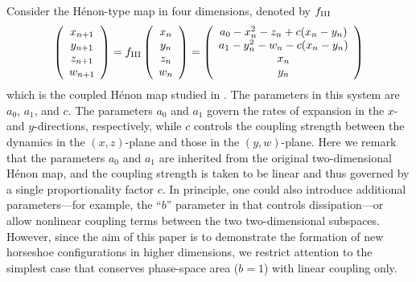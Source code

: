 \documentclass[12pt]{iopart}
\begin{document}
Consider the H\'{e}non-type map in four dimensions, denoted by $f_{\rm III}$
\begin{equation}\label{eq:4D doubly folded Henon}
\left( \begin{array}{ccc}
x_{n+1}\\
y_{n+1} \\
z_{n+1} \\
w_{n+1} \end{array} \right) = 
f_{\rm III} \left( \begin{array}{ccc}
x_{n}\\
y_{n} \\
z_{n}\\
w_{n} \end{array} \right) =
\left( \begin{array}{ccc}
a_0 - x^2_n - z_n + c(x_n - y_n)\\
a_1 - y^2_n - w_n - c(x_n - y_n)\\
x_n \\
y_n \end{array} \right)
\end{equation}
which is the coupled H\'{e}non map studied in \cite{Fujioka25}. The parameters in this system are $a_0$, $a_1$, and $c$. The parameters $a_0$ and $a_1$ govern the rates of expansion in the $x$- and $y$-directions, respectively, while $c$ controls the coupling strength between the dynamics in the $(x,z)$-plane and those in the $(y,w)$-plane. Here we remark that the parameters $a_0$ and $a_1$ are inherited from the original two-dimensional H\'enon map, and the coupling strength is taken to be linear and thus governed by a single proportionality factor $c$. In principle, one could also introduce additional parameters—for example, the “$b$” parameter in \cite{Henon76} that controls dissipation—or allow nonlinear coupling terms between the two two-dimensional subspaces. However, since the aim of this paper is to demonstrate the formation of new horseshoe configurations in higher dimensions, we restrict attention to the simplest case that conserves phase-space area ($b=1$) with linear coupling only.
\end{document}
